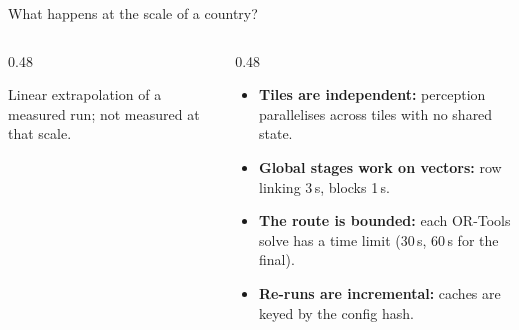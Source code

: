 \begin{frame}{What happens at the scale of a country?}
  \begin{columns}[T]
    \begin{column}{0.48\textwidth}
      \vspace{2.5mm}

      \vspace{2.5mm}

      \vspace{1.5mm}

      {\tiny\color{sxGrey} Linear extrapolation of a measured run; not measured at that scale.\par}
    \end{column}
    \begin{column}{0.48\textwidth}
      \footnotesize
      \begin{itemize}\setlength{\itemsep}{1.2mm}
        \item \textbf{Tiles are independent:} perception parallelises across tiles with no shared state.
        \item \textbf{Global stages work on vectors:} row linking 3\,s, blocks 1\,s.
        \item \textbf{The route is bounded:} each OR-Tools solve has a time limit (30\,s, 60\,s for the final).
        \item \textbf{Re-runs are incremental:} caches are keyed by the config hash.
      \end{itemize}
    \end{column}
  \end{columns}
\end{frame}

